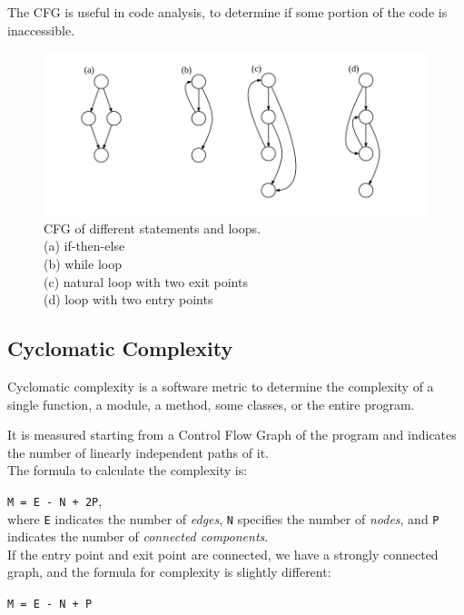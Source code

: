 The CFG is useful in code analysis, to determine if some portion of the code is inaccessible.

\begin{figure}[!h]
	\centering
	\includegraphics[width=1.0\columnwidth]{cfg.png}
	\caption{CFG of different statements and loops. \\
	(a) if-then-else\\
	(b) while loop\\
	(c) natural loop with two exit points\\
	(d) loop with two entry points	
}
	\label{fig:cfg}
\end{figure}

\subsection{Cyclomatic Complexity}
Cyclomatic complexity is a software metric to determine the complexity of a single function, a module, a method, some classes, or the entire program.

It is measured starting from a Control Flow Graph of the program and indicates the number of linearly independent paths of it. 
\\
The formula to calculate the complexity is:

\texttt{M =  E - N + 2P},\\
where \texttt{E} indicates the number of \textit{edges}, \texttt{N} specifies the number of \textit{nodes}, and \texttt{P} indicates the number of \textit{connected components}.\\

If the entry point and exit point are connected, we have a strongly connected graph, and the formula for complexity is slightly different: 

\texttt{M = E - N + P}

